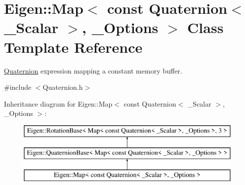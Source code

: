 \hypertarget{class_eigen_1_1_map_3_01const_01_quaternion_3_01___scalar_01_4_00_01___options_01_4}{}\section{Eigen\+::Map$<$ const Quaternion$<$ \+\_\+\+Scalar $>$, \+\_\+\+Options $>$ Class Template Reference}
\label{class_eigen_1_1_map_3_01const_01_quaternion_3_01___scalar_01_4_00_01___options_01_4}


\mbox{\hyperlink{class_eigen_1_1_quaternion}{Quaternion}} expression mapping a constant memory buffer.  




{\ttfamily \#include $<$Quaternion.\+h$>$}

Inheritance diagram for Eigen\+::Map$<$ const Quaternion$<$ \+\_\+\+Scalar $>$, \+\_\+\+Options $>$\+:\begin{figure}[H]
\begin{center}
\leavevmode
\includegraphics[height=3.000000cm]{class_eigen_1_1_map_3_01const_01_quaternion_3_01___scalar_01_4_00_01___options_01_4}
\end{center}
\end{figure}
